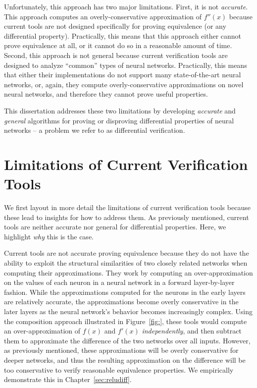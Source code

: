 Unfortunately, this approach has two major limitations. First, it is not
\textit{accurate}. This approach computes an overly-conservative approximation of
$ f''(x) $ because current tools are not designed specifically for proving
equivalence (or any differential property). Practically, this means that this
approach either cannot prove equivalence at all, or it cannot do so in a
reasonable amount of time. Second, this approach is not general because current
verification tools are designed to analyze ``common'' types of neural networks.
Practically, this means that either their implementations do not support many
state-of-the-art neural networks, or, again, they compute overly-conservative
approximations on novel neural networks, and therefore they cannot prove useful
properties.


This dissertation addresses these two limitations by developing \textit{accurate}
and \textit{general} algorithms for proving or disproving differential properties
of neural networks -- a problem we refer to as differential verification.


\section{Limitations of Current Verification Tools}
We first layout in more detail the limitations of current verification tools
because these lead to insights for how to address them. As previously mentioned,
current tools are neither accurate nor general for differential properties. Here,
we highlight \textit{why} this is the case.

Current tools are not accurate proving equivalence because they do not have the
ability to exploit the structural similarities of two closely related
networks when computing their approximations. They work by computing an
over-approximation on the values of each neuron in a neural network in a forward
layer-by-layer fashion. While the approximations computed for the neurons in the
early layers are relatively accurate, the approximations become overly
conservative in the later layers as the neural network's behavior becomes
increasingly complex. Using the composition
approach illustrated in Figure~\ref{fig:}, these tools would compute an
over-approximation of $ f(x) $ and $ f'(x) $  \textit{independently}, and then
subtract them to approximate the difference of the two networks over all inputs.
However, as previously mentioned, these approximations will be overly
conservative for deeper networks, and thus the resulting approximation on the
difference will be too conservative to verify reasonable equivalence properties.
We empirically demonstrate this in Chapter~\ref{sec:reludiff}.

